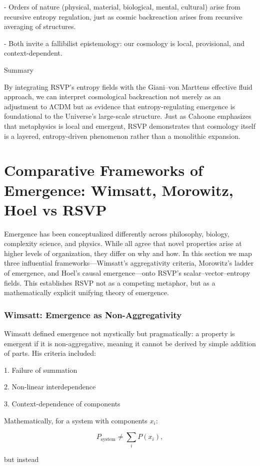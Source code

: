 \documentclass[12pt]{book}
\begin{document}
- Orders of nature (physical, material, biological, mental, cultural) arise from recursive entropy regulation, just as cosmic backreaction arises from recursive averaging of structures.

- Both invite a fallibilist epistemology: our cosmology is local, provisional, and context-dependent.

Summary

By integrating RSVP’s entropy fields with the Giani–von Marttens effective fluid approach, we can interpret cosmological backreaction not merely as an adjustment to ΛCDM but as evidence that entropy-regulating emergence is foundational to the Universe’s large-scale structure. Just as Cahoone emphasizes that metaphysics is local and emergent, RSVP demonstrates that cosmology itself is a layered, entropy-driven phenomenon rather than a monolithic expansion.

\chapter{Comparative Frameworks of Emergence: Wimsatt, Morowitz, Hoel vs RSVP}
Emergence has been conceptualized differently across philosophy, biology, complexity science, and physics. While all agree that novel properties arise at higher levels of organization, they differ on why and how. In this section we map three influential frameworks—Wimsatt’s aggregativity criteria, Morowitz’s ladder of emergence, and Hoel’s causal emergence—onto RSVP’s scalar–vector–entropy fields. This establishes RSVP not as a competing metaphor, but as a mathematically explicit unifying theory of emergence.

\subsection{Wimsatt: Emergence as Non-Aggregativity}
Wimsatt defined emergence not mystically but pragmatically: a property is emergent if it is non-aggregative, meaning it cannot be derived by simple addition of parts. His criteria included:

1. Failure of summation

2. Non-linear interdependence

3. Context-dependence of components

Mathematically, for a system with components \( x_i \):

\[ P_{\text{system}} \neq \sum_i P(x_i), \]

but instead
\end{document}
